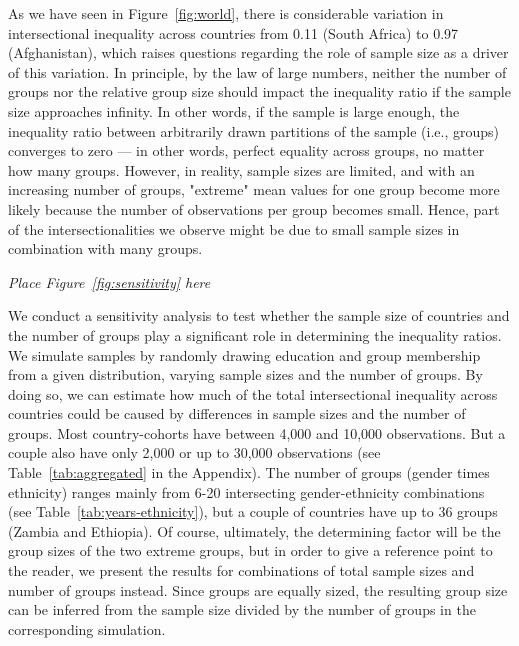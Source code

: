 As we have seen in Figure~\ref{fig:world}, there is considerable variation in intersectional inequality across countries from 0.11 (South Africa) to 0.97 (Afghanistan), which raises questions regarding the role of sample size as a driver of this variation. In principle, by the law of large numbers, neither the number of groups nor the relative group size should impact the inequality ratio if the sample size approaches infinity. In other words, if the sample is large enough, the inequality ratio between arbitrarily drawn partitions of the sample (i.e., groups) converges to zero --- in other words, perfect equality across groups, no matter how many groups. However, in reality, sample sizes are limited, and with an increasing number of groups, "extreme" mean values for one group become more likely because the number of observations per group becomes small. Hence, part of the intersectionalities we observe might be due to small sample sizes in combination with many groups.

\begin{center}
    \textit{Place Figure~\ref{fig:sensitivity} here}
\end{center}

We conduct a sensitivity analysis to test whether the sample size of countries and the number of groups play a significant role in determining the inequality ratios. We simulate samples by randomly drawing education and group membership from a given distribution, varying sample sizes and the number of groups. By doing so, we can estimate how much of the total intersectional inequality across countries could be caused by differences in sample sizes and the number of groups. Most country-cohorts have between 4,000 and 10,000 observations. But a couple also have only 2,000 or up to 30,000 observations (see Table~\ref{tab:aggregated} in the Appendix). The number of groups (gender times ethnicity) ranges mainly from 6-20 intersecting gender-ethnicity combinations (see Table~\ref{tab:years-ethnicity}), but a couple of countries have up to 36 groups (Zambia and Ethiopia). Of course, ultimately, the determining factor will be the group sizes of the two extreme groups, but in order to give a reference point to the reader, we present the results for combinations of total sample sizes and number of groups instead. Since groups are equally sized, the resulting group size can be inferred from the sample size divided by the number of groups in the corresponding simulation.

